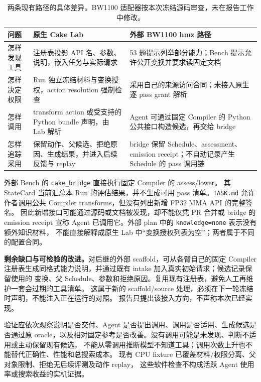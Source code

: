 \documentclass[UTF8,11pt,a4paper,fontset=none]{ctexart}
\newcommand{\code}[1]{\texttt{#1}}
\begin{document}
\begin{table}[htbp]
\centering\footnotesize
\caption{两条现有路径的具体差异。BW1100 适配器按本次冻结源码审查，未在报告工作中修改。}
\begin{tabularx}{\textwidth}{@{}p{26mm}Y Y@{}}
\toprule
{}问题 & 原生 Cake Lab & 外部 BW1100 hmz 路径 \\
\midrule
怎样发现工具 & 注册表投影 API 名、参数、说明，嵌入任务与实际请求 & 53 题提示列举部分能力；Bench 提示允许公开变换并要求读固定文档 \\
怎样决定权限 & Run 独立冻结材料与变换授权，action resolution 强制检查 & 采用自己的来源访问合同；未接入原生逐 pass grant 解析 \\
怎样调用 & transform action 或受支持的 Python bundle 声明，由 Lab 解析 & Agent 可通过固定 Compiler 的 Python 公共接口构造候选，再交给 bridge \\
怎样追踪采用 & 保留动作、父候选、拒绝原因、生成结果，并进入后续反馈与 replay & bridge 保留 Schedule、assessment、emission receipt；不自动记录产生 Schedule 的 pass 调用链 \\
\bottomrule
\end{tabularx}
\end{table}

外部 Bench 的 \code{cake\_bridge} 直接执行固定 Compiler 的 assess/lower。
其 StateCard 当前汇总本 Run 的评估结果，并不生成可用 pass 清单。\code{TASK.md}
允许作者调用公共 Compiler transforms，但没有列出新增 FP32 MMA API 的完整签名。
因此新增接口可能通过源码或文档被发现，却不能仅凭 PR 合并或 bridge 的 emission receipt
宣称 Agent 已调用它。外部 plan 中的 \code{knowledge=none} 表示没有额外知识材料，
不能直接解释成原生 Lab 中“变换授权列表为空”；两者属于不同的配置合同\cite{bwexternal}。

\textbf{剩余缺口与可检验的改进。}对后继的外部 scaffold，可从各臂自己的固定 Compiler
注册表生成同格式能力说明，并通过既有 intake 加入真实初始请求；候选记录保留使用的
变换、父 Schedule、参数和拒绝原因。复用现有注册表，避免人工再维护一套会过期的工具清单。
这属于新的 scaffold/source 处理，必须在下一轮冻结时声明，不能注入正在运行的对照。
报告只提出该接入方向，不声称本次已经实现。

验证应依次观察说明是否交付、Agent 是否提出调用、调用是否适用、生成候选是否通过原
oracle，以及相对固定参考是否改善。没有调用可能是未发现、判断不适用或主动保留现有候选，
不能从零调用推断模型不知道工具；调用次数上升也不能替代正确性、性能和总搜索成本。
现有 CPU fixture 已覆盖材料/权限分离、父对象限制、拒绝无后续评测及动作 replay，
这些软件检查不构成活跃 Agent 使用率或搜索收益的实机证据。
\FloatBarrier
\end{document}
